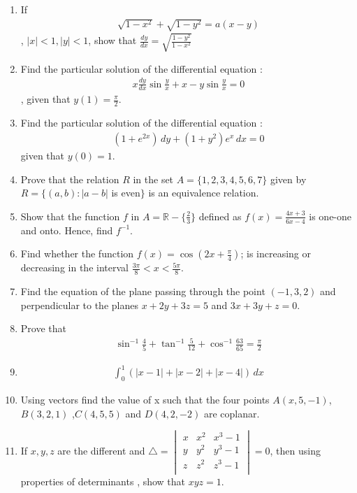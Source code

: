 \documentclass[12pt,-letter paper]{article}
\begin{document}
\begin{enumerate}
\item If \begin{align*}\sqrt{1-x^2}+\sqrt{1-y^2}=a(x-y)\end{align*}, $|x|<1,|y|<1$, show that $\frac{dy}{dx}=\sqrt{\frac{1-y^2}{1-x^2}}$

\item Find the particular solution of the differential equation :\begin{align*}x\frac{dy}{dx}\sin\frac{y}{x}+x-y\sin\frac{y}{x}=0\end{align*}, given that $y(1)=\frac{\pi}{2}$.

	\item Find the particular solution of the differential equation :\begin{align*}(1+e^{2x})\,dy+(1+y^2)e^x\,dx=0\end{align*} given that $y(0)=1$.	

\item Prove that the relation $R$ in the set $A=\{1,2,3,4,5,6,7\}$ given by $R=\{(a,b) : |a-b|$ is even$\}$ is an equivalence relation.

\item Show that the function $f$ in $A=\mathbb{R}-\{\frac{2}{3}\}$ defined as $f(x)=\frac{4x+3}{6x-4}$ is one-one and onto. Hence, find $f^{-1}$.
			
\item Find whether the function $f(x)=\cos(2x+\frac{\pi}{4})$; is increasing or decreasing in the interval $\frac{3\pi}{8}<x<\frac{5\pi}{8}$.

\item Find the equation of the plane passing through the point $(-1,3,2)$ and perpendicular to the planes $x+2y+3z=5$ and $3x+3y+z=0$.	

\item Prove that \begin{align*}\sin^{-1}\frac{4}{5}+\tan^{-1}\frac{5}{12}+\cos^{-1}\frac{63}{65}=\frac{\pi}{2}\end{align*}

\item \begin{align*}\int_{0}^{1}(|x-1|+|x-2|+|x-4|)\,dx\end{align*}

\item Using vectors find the value of x such that the four points $A(x,5,-1)$, $B(3,2,1)$ ,$C(4,5,5)$ and $D(4,2,-2)$ are coplanar.	

\item If $x,y,z$ are the different and $\triangle =\begin{vmatrix}    
		                                        x & x^2 & x^3-1\\
							y & y^2 & y^3-1\\
							z & z^2 &z^3-1\\
\end{vmatrix}=0$, then using properties of determinants , show that $xyz=1$.


\end{enumerate}
\end{document}
